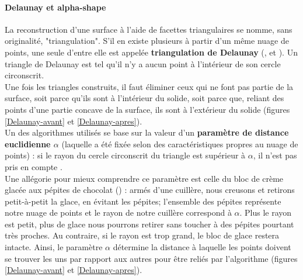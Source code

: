 \documentclass[a4paper,10pt]{report}
\begin{document}
\paragraph{Delaunay et alpha-shape}\label{alpha-shape}
La reconstruction d'une surface à l'aide de facettes triangulaires se nomme, sans originalité, "triangulation". S'il en existe plusieurs à partir d'un même nuage de points, une seule d'entre 
elle est appelée \textbf{triangulation de Delaunay} (\cite{Delaunay}, \cite{2algo} et \cite{edelsbrunner}). Un triangle de Delaunay est tel qu'il n'y a aucun point à l'intérieur de son cercle circonscrit.\\
Une fois les triangles construits, il faut éliminer ceux qui ne font pas partie de la surface, soit parce qu'ils sont à l'intérieur du solide, soit parce que, reliant des points d'une partie concave de la surface, ils sont à l'extérieur du solide (figures \ref{Delaunay-avant} et \ref{Delaunay-apres}).\\
Un des algorithmes utilisés se base sur la valeur d'un \textbf{paramètre de distance euclidienne \(\alpha\)} (laquelle a été fixée selon des caractéristiques propres au nuage de points) :
si le rayon du cercle circonscrit du triangle est supérieur à \(\alpha\), il n'est pas pris en compte \cite{alpha}.\\
Une allégorie pour mieux comprendre ce paramètre est celle du bloc de crème glacée aux pépites de chocolat (\cite{glace}) : armés d'une cuillère,
nous creusons et retirons petit-à-petit la glace, en évitant les pépites; l'ensemble des pépites représente notre nuage de points et le rayon de notre cuillère correspond à \(\alpha\).
Plus le rayon est petit, plus de glace nous pourrons retirer sans toucher à des pépites pourtant très proches. Au contraire, si le rayon est trop grand, le bloc de glace restera intacte.
Ainsi, le paramètre \(\alpha\) détermine la distance à laquelle les points doivent se trouver les uns par rapport aux autres pour être reliés par l'algorithme (figures \ref{Delaunay-avant} et \ref{Delaunay-apres}).
\end{document}
